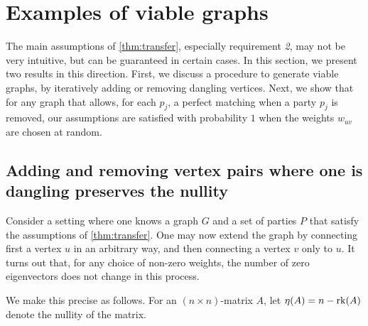 \section{Examples of viable graphs}
\label{sec:viablegraphs}

The main assumptions of \cref{thm:transfer}, especially requirement \emph{2}, may not be very intuitive, but can be guaranteed in certain cases. In this section, we present two results in this direction. First, we discuss a procedure to generate viable graphs, by iteratively adding or removing dangling vertices. Next, we show that for any graph that allows, for each $p_j$, a perfect matching when a party $p_j$ is removed, our assumptions are satisfied with probability $1$ when the weights $w_{uv}$ are chosen at random. 

\subsection{Adding and removing vertex pairs where one is dangling preserves the nullity}
\label{sec:addingvertices}
Consider a setting where one knows a graph $G$ and a set of parties $P$ that satisfy the assumptions of \cref{thm:transfer}. One may now extend the graph by connecting first a vertex $u$ in an arbitrary way, and then connecting a vertex $v$ only to $u$. It turns out that, for any choice of non-zero weights, the number of zero eigenvectors does not change in this process. 

We make this precise as follows. For an $(n\times n)$-matrix $A$, let $\eta(A)=n-\operatorname{rk}(A)$ denote the nullity of the matrix.

